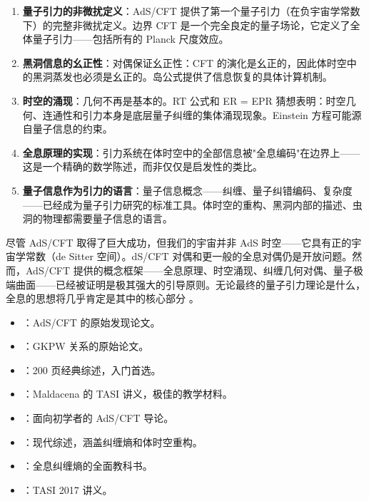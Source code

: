 \begin{enumerate}
    \item \textbf{量子引力的非微扰定义}：AdS/CFT 提供了第一个量子引力（在负宇宙学常数下）的完整非微扰定义。边界 CFT 是一个完全良定的量子场论，它定义了全体量子引力——包括所有的 Planck 尺度效应。
    
    \item \textbf{黑洞信息的幺正性}：对偶保证幺正性：CFT 的演化是幺正的，因此体时空中的黑洞蒸发也必须是幺正的。岛公式提供了信息恢复的具体计算机制。
    
    \item \textbf{时空的涌现}：几何不再是基本的。RT 公式和 ER = EPR 猜想表明：时空几何、连通性和引力本身是底层量子纠缠的集体涌现现象。Einstein 方程可能源自量子信息的约束。
    
    \item \textbf{全息原理的实现}：引力系统在体时空中的全部信息被"全息编码"在边界上——这是一个精确的数学陈述，而非仅仅是启发性的类比。
    
    \item \textbf{量子信息作为引力的语言}：量子信息概念——纠缠、量子纠错编码、复杂度——已经成为量子引力研究的标准工具。体时空的重构、黑洞内部的描述、虫洞的物理都需要量子信息的语言。
\end{enumerate}

\begin{remark}[展望]
    尽管 AdS/CFT 取得了巨大成功，但我们的宇宙并非 AdS 时空——它具有正的宇宙学常数（de Sitter 空间）。dS/CFT 对偶和更一般的全息对偶仍是开放问题。然而，AdS/CFT 提供的概念框架——全息原理、时空涌现、纠缠几何对偶、量子极端曲面——已经被证明是极其强大的引导原则。无论最终的量子引力理论是什么，全息的思想将几乎肯定是其中的核心部分 \cite{Aharony1999,Hubeny2015,Maldacena2003}。
\end{remark}

\begin{note}[进一步阅读]
    \begin{itemize}
        \item \cite{Maldacena1997}：AdS/CFT 的原始发现论文。
        \item \cite{Witten1998,Gubser1998}：GKPW 关系的原始论文。
        \item \cite{Aharony1999}：200 页经典综述，入门首选。
        \item \cite{Maldacena2003}：Maldacena 的 TASI 讲义，极佳的教学材料。
        \item \cite{Nastase2007}：面向初学者的 AdS/CFT 导论。
        \item \cite{Hubeny2015}：现代综述，涵盖纠缠熵和体时空重构。
        \item \cite{Rangamani2016}：全息纠缠熵的全面教科书。
        \item \cite{Erdmenger2018}：TASI 2017 讲义。
    \end{itemize}
\end{note}
